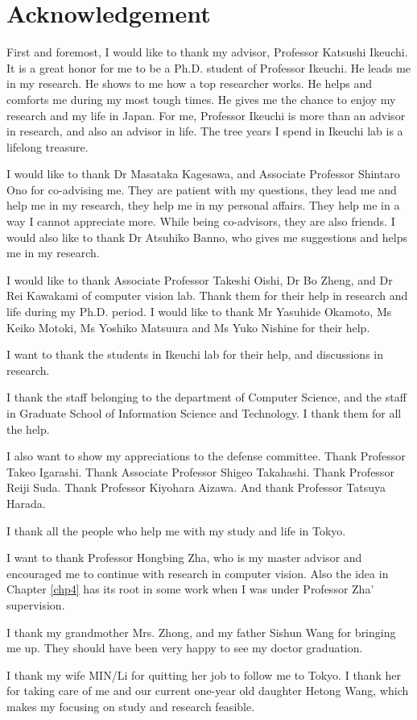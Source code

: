 

\chapter*{Acknowledgement}
%
\thispagestyle{empty}%
First and foremost, I would like to thank my advisor, Professor Katsushi Ikeuchi. It is a great honor for me to be a Ph.D. student of Professor Ikeuchi. He leads me in my research. He shows to me how a top researcher works. He helps and comforts me during my most tough times. He gives me the chance to enjoy my research and my life in Japan. For me, Professor Ikeuchi is more than an advisor in research, and also an advisor in life. The tree years I spend in Ikeuchi lab is a lifelong treasure.

I would like to thank Dr Masataka Kagesawa, and Associate Professor Shintaro Ono for co-advising me. They are patient with my questions, they lead me and help me in my research, they help me in my personal affairs. They help me in a way I cannot appreciate more. While being co-advisors, they are also friends. I would also like to thank Dr Atsuhiko Banno, who gives me suggestions and helps me in my research.

I would like to thank Associate Professor Takeshi Oishi, Dr Bo Zheng, and Dr Rei Kawakami of computer vision lab. Thank them for their help in research and life during my Ph.D. period. I would like to thank Mr Yasuhide Okamoto, Ms Keiko Motoki,  Ms Yoshiko Matsuura and Ms Yuko Nishine for their help.

I want to thank the students in Ikeuchi lab for their help, and discussions in research.

I thank the staff belonging to the department of Computer Science, and the staff in Graduate School of Information Science and Technology. I thank them for all the help.


I also want to show my appreciations to the defense  committee. Thank Professor Takeo Igarashi. Thank Associate Professor Shigeo Takahashi. Thank Professor Reiji Suda. Thank  Professor Kiyohara Aizawa. And thank Professor Tatsuya Harada.

I thank all the people who help me with my study and life in Tokyo.

I want to thank Professor Hongbing Zha, who is my master advisor and encouraged me to continue with research in computer vision. Also the idea in Chapter \ref{chp4} has its root in some work when I was under Professor Zha' supervision.

I thank my grandmother Mrs. Zhong, and my father Sishun Wang for bringing me up. They should have been very happy to see my doctor graduation.

I thank my wife MIN/Li for quitting her job to follow me to Tokyo. I thank her for taking care of me and our current one-year old daughter Hetong Wang, which makes my focusing on study and research feasible.
\cleardoublepage
